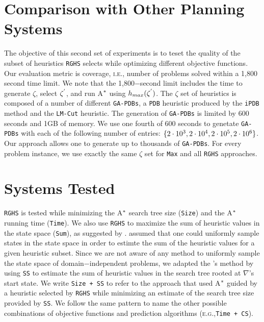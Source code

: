 \section{Comparison with Other Planning Systems}
\noindent
The objective of this second set of experiments is to teset the quality of the subset of heuristics \texttt{RGHS} selects while optimizing different objective functions. Our evaluation metric is coverage, \textsc{i.e.,} number of problems solved within a 1,800 second time limit. We note that the 1,800$-$second limit includes the time to generate $\zeta$, select $\zeta\sp{'}$, and run A$\sp{*}$ using $h_{max}(\zeta\sp{'})$. The $\zeta$ set of heuristics is composed of a number of different \texttt{GA-PDBs}, a \texttt{PDB} heuristic produced by the \texttt{iPDB} method \cite{haslum2007domain} and the \texttt{LM-Cut} heuristic. The generation of \texttt{GA-PDBs} is limited by 600 seconds and 1GB of memory. We use one fourth of 600 seconds to genetate \texttt{GA-PDBs} with each of the following number of entries: $\{2 \cdot 10\sp{3}, 2 \cdot 10\sp{4}, 2 \cdot 10\sp{5}, 2 \cdot 10\sp{6}\}$. Our approach allows one to generate up to thousands of \texttt{GA-PDBs}. For every problem instance, we use exactly the same $\zeta$ set for \texttt{Max} and all \texttt{RGHS} approaches.\\

\section{Systems Tested}
\noindent
\texttt{RGHS} is tested while minimizing the A$\sp{*}$ search tree size (\texttt{Size}) and the A$\sp{*}$ running time (\texttt{Time}). We also use \texttt{RGHS} to maximize the sum of heuristic values in the state space (\texttt{Sum}), as suggested by \cite{raynersss13}. \cite{raynersss13} assumed that one could uniformly sample states in the state space in order to estimte the sum of the heuristic values for a given heuristic subset. Since we are not aware of any method to uniformly sample the state space of domain$-$independent problems, we adapted the \cite{raynersss13}'s method by using \texttt{SS} to estimate the sum of heuristic values in the search tree rooted at $\nabla$'s start state. We write \texttt{Size + SS} to refer to the approach that used A$\sp{*}$ guided by a heuristic selected by \texttt{RGHS} while minimizing an estimate of the search tree size provided by \texttt{SS}. We follow the same pattern to name the other possible combinations of objective functions and prediction algorithms (\textsc{e.g.,}\texttt{Time + CS}).\\


